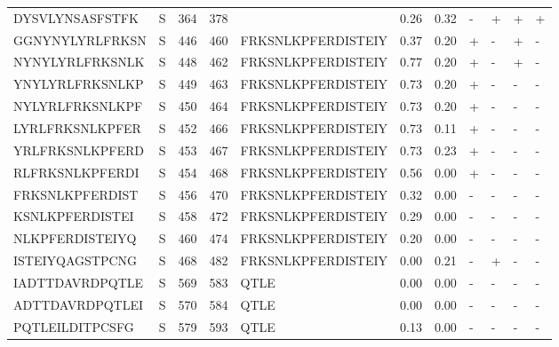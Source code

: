 \begin{tabular}{llrrlrrllll}
DYSVLYNSASFSTFK &       S &    364 &   378 &                     &            0.26 &             0.32 &      - &       + &      + &       + \\
GGNYNYLYRLFRKSN &       S &    446 &   460 &  FRKSNLKPFERDISTEIY &            0.37 &             0.20 &      + &       - &      + &       - \\
NYNYLYRLFRKSNLK &       S &    448 &   462 &  FRKSNLKPFERDISTEIY &            0.77 &             0.20 &      + &       - &      + &       - \\
YNYLYRLFRKSNLKP &       S &    449 &   463 &  FRKSNLKPFERDISTEIY &            0.73 &             0.20 &      + &       - &      - &       - \\
NYLYRLFRKSNLKPF &       S &    450 &   464 &  FRKSNLKPFERDISTEIY &            0.73 &             0.20 &      + &       - &      - &       - \\
LYRLFRKSNLKPFER &       S &    452 &   466 &  FRKSNLKPFERDISTEIY &            0.73 &             0.11 &      + &       - &      - &       - \\
YRLFRKSNLKPFERD &       S &    453 &   467 &  FRKSNLKPFERDISTEIY &            0.73 &             0.23 &      + &       - &      - &       - \\
RLFRKSNLKPFERDI &       S &    454 &   468 &  FRKSNLKPFERDISTEIY &            0.56 &             0.00 &      + &       - &      - &       - \\
FRKSNLKPFERDIST &       S &    456 &   470 &  FRKSNLKPFERDISTEIY &            0.32 &             0.00 &      - &       - &      - &       - \\
KSNLKPFERDISTEI &       S &    458 &   472 &  FRKSNLKPFERDISTEIY &            0.29 &             0.00 &      - &       - &      - &       - \\
NLKPFERDISTEIYQ &       S &    460 &   474 &  FRKSNLKPFERDISTEIY &            0.20 &             0.00 &      - &       - &      - &       - \\
ISTEIYQAGSTPCNG &       S &    468 &   482 &  FRKSNLKPFERDISTEIY &            0.00 &             0.21 &      - &       + &      - &       - \\
IADTTDAVRDPQTLE &       S &    569 &   583 &                QTLE &            0.00 &             0.00 &      - &       - &      - &       - \\
ADTTDAVRDPQTLEI &       S &    570 &   584 &                QTLE &            0.00 &             0.00 &      - &       - &      - &       - \\
PQTLEILDITPCSFG &       S &    579 &   593 &                QTLE &            0.13 &             0.00 &      - &       - &      - &       - \\

\end{tabular}
